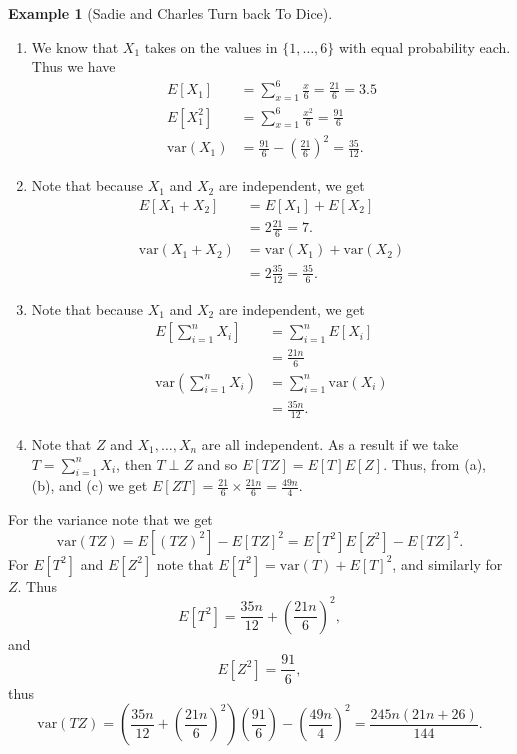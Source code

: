 \documentclass[
  letterpaper,
  DIV=11,
  numbers=noendperiod]{scrreprt}
\theoremstyle{definition}
\theoremstyle{definition}
\newtheorem{example}{Example}[chapter]
\theoremstyle{definition}
\theoremstyle{remark}
\begin{document}
\begin{example}[Sadie and Charles Turn back To
Dice]
\begin{tcolorbox}[enhanced jigsaw, colback=white, colframe=quarto-callout-color-frame, arc=.35mm, leftrule=.75mm, rightrule=.15mm, opacityback=0, breakable, bottomrule=.15mm, left=2mm, toprule=.15mm]
\begin{enumerate}
\def\labelenumi{\alph{enumi}.}
\item
  We know that \(X_1\) takes on the values in \(\{1,\dots,6\}\) with
  equal probability each. Thus we have \begin{align*}
  E[X_1] &= \sum_{x=1}^6 \frac{x}{6} = \frac{21}{6} = 3.5 \\
  E[X_1^2] &= \sum_{x=1}^6 \frac{x^2}{6} = \frac{91}{6} \\
  \text{var}(X_1) &= \frac{91}{6} - \left(\frac{21}{6}\right)^2 = \frac{35}{12}.
  \end{align*}
\item
  Note that because \(X_1\) and \(X_2\) are independent, we get
  \begin{align*}
   E[X_1 + X_2] &= E[X_1] + E[X_2] \\
   &= 2\frac{21}{6} = 7.\\
   \text{var}(X_1 + X_2) &= \text{var}(X_1) + \text{var}(X_2) \\
   &= 2\frac{35}{12} = \frac{35}{6}.
  \end{align*}
\item
  Note that because \(X_1\) and \(X_2\) are independent, we get
  \begin{align*}
   E[\sum_{i=1}^n X_i] &= \sum_{i=1}^n E[X_i]\\
   &= \frac{21n}{6}\\
   \text{var}(\sum_{i=1}^nX_i) &= \sum_{i=1}^n\text{var}(X_i)\\
   &= \frac{35n}{12}.
  \end{align*}
\item
  Note that \(Z\) and \(X_1,\dots,X_n\) are all independent. As a result
  if we take \(T = \sum_{i=1}^n X_i\), then \(T \perp Z\) and so
  \(E[TZ] = E[T]E[Z]\). Thus, from (a), (b), and (c) we get
  \(E[ZT] = \frac{21}{6}\times\frac{21n}{6} = \frac{49n}{4}\).
\end{enumerate}

For the variance note that we get
\[\text{var}(TZ) = E[(TZ)^2] - E[TZ]^2 = E[T^2]E[Z^2] - E[TZ]^2.\] For
\(E[T^2]\) and \(E[Z^2]\) note that \(E[T^2] = \text{var}(T) + E[T]^2\),
and similarly for \(Z\). Thus
\[E[T^2] = \frac{35n}{12} + \left(\frac{21n}{6}\right)^2,\] and
\[E[Z^2] = \frac{91}{6},\] thus
\[\text{var}(TZ) = \left(\frac{35n}{12} + \left(\frac{21n}{6}\right)^2\right)\left(\frac{91}{6}\right) - \left( \frac{49n}{4}\right)^2 = \frac{245n(21n + 26)}{144}.\]

\end{tcolorbox}

\end{example}
\end{document}
